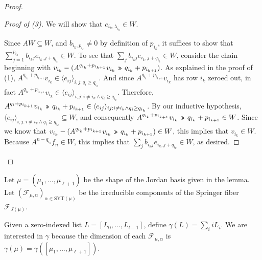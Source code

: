 \documentclass[12pt,psamsfonts]{article}
\newcommand{\leftshift}{\,\texttt{<<}\,}
\newcommand{\rightshift}{\mathbin{\rotatebox[origin=c]{180}{\leftshift}}}
\begin{document}
\begin{proof}
\begin{proof}[Proof of (3)]
        We will show that \(e_{i_k, \lambda_{i_k}} \in W\).
        \par Since \(AW \subseteq W\), and \(b_{i_k,p_{i_k}} \neq 0\) by definition of \(p_{i_k}\), it suffices to show that \(\sum_{j = 1}^{p_{i_k}} b_{i_kj} e_{i_k,j + q_{i_k}} \in W\).
        To see that \(\sum_j b_{i_kj}e_{i_k,j + q_{i_k}} \in W\), consider the chain beginning with \(v_{i_k} - (A^{q_{i_k} + p_{i_{k + 1}}} v_{i_k} \rightshift q_{i_k} + p_{i_{k + 1}})\).
        As explained in the proof of (1), \(A^{q_{i_k} + p_{i_{k + 1}}} v_{i_k} \in \langle e_{ij} \rangle_{i,j: q_i \geq q_{i_k}}\).
        And since \(A^{q_{i_k} + p_{i_{k + 1}}} v_{i_k}\) has row \(i_k\) zeroed out, in fact \(A^{q_{i_k} + p_{i_{k + 1}}} v_{i_k} \in \langle e_{ij} \rangle_{i,j : i \neq i_k \land q_i \geq q_{i_k}}\).
        Therefore, \(A^{q_i + p_{i_{k + 1}}} v_{i_k} \rightshift q_{i_k} + p_{i_{k + 1}} \in \langle e_{ij} \rangle_{ij : i \neq i_k \land q_i \geq q_{i_k}}\).
        By our inductive hypothesis, \(\langle e_{ij} \rangle_{i,j : i \neq i_k \land q_i \geq q_{i_k}} \subseteq W\), and consequently \(A^{q_{i_k} + p_{i_{k + 1}}} v_{i_k} \rightshift q_{i_k} + p_{i_{k + 1}} \in W\).
        Since we know that \(v_{i_k} - (A^{q_{i_k} + p_{i_{k + 1}}} v_{i_k} \rightshift q_{i_k} + p_{i_{k + 1}}) \in W\), this implies that \(v_{i_k} \in W\).
        Because \(A^{n - q_{i_k}} f_n \in W\), this implies that \(\sum_j b_{i_kj} e_{i_k,j + q_{i_k}} \in W\), as desired.
    \end{proof}
\end{proof}

Let \(\mu = (\mu_1, ..., \mu_{\ell + 1})\) be the shape of the Jordan basis given in the lemma.
Let \((\mathcal{F}_{\mu,\alpha})_{\alpha \in \mathrm{SYT}(\mu)}\) be the irreducible components of the Springer fiber \(\mathcal{F}_{J(\mu)}\).
\par Given a zero-indexed list \(L = [L_0, ..., L_{l - 1}]\), define \(\gamma(L) = \sum_i i L_i\).
We are interested in \(\gamma\) because the dimension of each \(\mathcal{F}_{\mu, \alpha}\) is \(\gamma(\mu) = \gamma([\mu_1, ..., \mu_{\ell + 1}])\).
\end{document}
